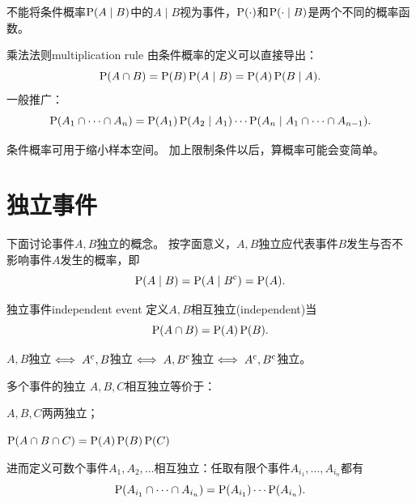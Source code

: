 \begin{remark}
	不能将条件概率$\P(A \mid B)$中的$A \mid B$视为事件，$\P(\cdot)$和$\P(\cdot \mid B)$是两个不同的概率函数。
\end{remark}

\begin{theorem}{乘法法则}{multiplication rule}
	由条件概率的定义可以直接导出：
	\begin{equation}
		\P(A \cap B) = \P(B)\P(A \mid B) = \P(A)\P(B \mid A).
	\end{equation}
	一般推广：
	\begin{equation}
		\P(A_1 \cap \cdots \cap A_n) = \P(A_1)\P(A_2 \mid A_1)\cdots\P(A_n \mid A_1 \cap \cdots \cap A_{n-1}).
	\end{equation}
\end{theorem}

\begin{remark}
	条件概率可用于缩小样本空间。
	加上限制条件以后，算概率可能会变简单。
\end{remark}

\section{独立事件}

下面讨论事件$A,B$独立的概念。
按字面意义，$A,B$独立应代表事件$B$发生与否不影响事件$A$发生的概率，即
\[
	\P(A \mid B) = \P(A \mid B\eventcomp) = \P(A).
\]

\begin{definition}{独立事件}{independent event}
	定义$A,B$相互独立(independent)当
	\begin{equation}
		\P(A \cap B) = \P(A)\P(B).
	\end{equation}
\end{definition}

\begin{corollary}
	$A,B$独立$\iff A\eventcomp,B$独立$\iff A,B\eventcomp$独立$\iff A\eventcomp,B\eventcomp$独立。
\end{corollary}

\begin{definition}{多个事件的独立}{}
	$A,B,C$相互独立等价于：
	\begin{compactenum}
		\item $A,B,C$两两独立；
		\item $\P(A \cap B \cap C) = \P(A)\P(B)\P(C)$
	\end{compactenum}
	进而定义可数个事件$A_1,A_2,\ldots$相互独立：任取有限个事件$A_{i_1},\ldots,A_{i_n}$都有
	\begin{equation}\label{eq:ps-mutual-independence}
		\P(A_{i_1} \cap \cdots \cap A_{i_n}) = \P(A_{i_1})\cdots\P(A_{i_n}).
	\end{equation}
\end{definition}

